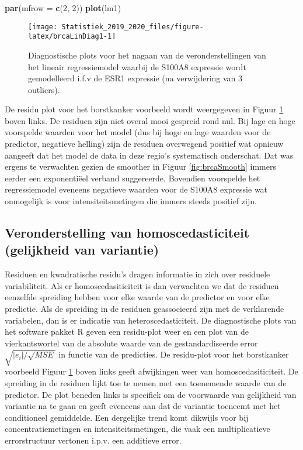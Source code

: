 \documentclass[12pt,dutch,coursenotes]{book}
\newenvironment{Shaded}{\begin{snugshade}}{\end{snugshade}}
\newcommand{\KeywordTok}[1]{\textcolor[rgb]{0.13,0.29,0.53}{\textbf{#1}}}
\newcommand{\DataTypeTok}[1]{\textcolor[rgb]{0.13,0.29,0.53}{#1}}
\newcommand{\DecValTok}[1]{\textcolor[rgb]{0.00,0.00,0.81}{#1}}
\newcommand{\NormalTok}[1]{#1}
\theoremstyle{definition}
\theoremstyle{definition}
\theoremstyle{definition}
\theoremstyle{remark}
\begin{document}
\begin{Shaded}
\begin{Highlighting}[]
\KeywordTok{par}\NormalTok{(}\DataTypeTok{mfrow =} \KeywordTok{c}\NormalTok{(}\DecValTok{2}\NormalTok{, }\DecValTok{2}\NormalTok{))}
\KeywordTok{plot}\NormalTok{(lm1)}
\end{Highlighting}
\end{Shaded}

\begin{figure}

{\centering \texttt{[image: Statistiek\_2019\_2020\_files/figure-latex/brcaLinDiag1-1]} 

}

\caption{Diagnostische plots voor het nagaan van de veronderstellingen van het lineair regressiemodel waarbij de S100A8 expressie wordt gemodelleerd i.f.v de ESR1 expressie (na verwijdering van 3 outliers).}\label{fig:brcaLinDiag1}
\end{figure}

De residu plot voor het borstkanker voorbeeld wordt weergegeven in
Figuur \ref{fig:brcaLinDiag1} boven links. De residuen zijn niet overal
mooi gespreid rond nul. Bij lage en hoge voorspelde waarden voor het
model (dus bij hoge en lage waarden voor de predictor, negatieve
helling) zijn de residuen overwegend positief wat opnieuw aangeeft dat
het model de data in deze regio's systematisch onderschat. Dat was
ergens te verwachten gezien de smoother in Figuur \ref{fig:brcaSmooth}
immers eerder een exponentiëel verband suggereerde. Bovendien voorspelde
het regressiemodel eveneens negatieve waarden voor de S100A8 expressie
wat onmogelijk is voor intensiteitsmetingen die immers steeds positief
zijn.

\subsection{Veronderstelling van homoscedasticiteit (gelijkheid van
variantie)}\label{veronderstelling-van-homoscedasticiteit-gelijkheid-van-variantie}

Residuen en kwadratische residu's dragen informatie in zich over
residuele variabiliteit. Als er homoscedasiticiteit is dan verwachten we
dat de residuen eenzelfde spreiding hebben voor elke waarde van de
predictor en voor elke predictie. Als de spreiding in de residuen
geassocieerd zijn met de verklarende variabelen, dan is er indicatie van
heteroscedasticiteit. De diagnostische plots van het software pakket R
geven een residu-plot weer en een plot van de vierkantswortel van de
absolute waarde van de gestandardiseerde error
\(\sqrt{|e_i|/\sqrt{MSE}}\) in functie van de predicties. De residu-plot
voor het borstkanker voorbeeld Figuur \ref{fig:brcaLinDiag1} boven links
geeft afwijkingen weer van homoscedasiticiteit. De spreiding in de
residuen lijkt toe te nemen met een toenemende waarde van de predictor.
De plot beneden links is specifiek om de voorwaarde van gelijkheid van
variantie na te gaan en geeft eveneens aan dat de variantie toeneemt met
het conditioneel gemiddelde. Een dergelijke trend komt dikwijls voor bij
concentratiemetingen en intensiteitsmetingen, die vaak een
multiplicatieve errorstructuur vertonen i.p.v. een additieve error.
\end{document}
